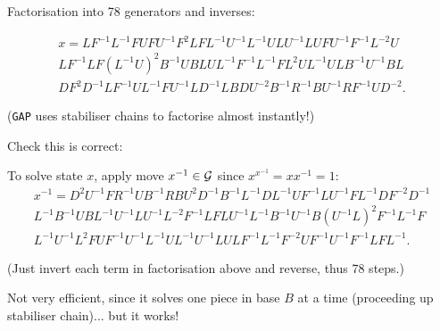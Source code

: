 \begin{slide}
    Factorisation into 78 generators and inverses: \pause
    {\scriptsize }
    \vspace{-0.5cm}

    {\footnotesize \begin{multline*}
            x = LF^{-1}L^{-1}FUFU^{-1}F^2LFL^{-1}U^{-1}L^{-1}ULU^{-1}LUFU^{-1}F^{-1}L^{-2}U \\
            LF^{-1}LF(L^{-1}U)^2B^{-1}UBLUL^{-1}F^{-1}L^{-1}FL^2UL^{-1}ULB^{-1}U^{-1}BL \\
            DF^2D^{-1}LF^{-1}UL^{-1}FU^{-1}LD^{-1}LBDU^{-2}B^{-1}R^{-1}BU^{-1}RF^{-1}UD^{-2}.
        \end{multline*}} \pause

    \vspace{-0.5cm}
    (\texttt{GAP} uses stabiliser chains to factorise almost instantly!)
\end{slide}

\begin{slide}
    Check this is correct:
    {\scriptsize } \pause

    To solve state $x$, apply move $x^{-1} \in \mathcal{G}$ since \pause $x^{x^{-1}} = xx^{-1} = 1$:
    {\scriptsize \begin{multline*}
        x^{-1} = D^2U^{-1}FR^{-1}UB^{-1}RBU^2D^{-1}B^{-1}L^{-1}DL^{-1}UF^{-1}LU^{-1}FL^{-1}DF^{-2}D^{-1} \\
        L^{-1}B^{-1}UBL^{-1}U^{-1}LU^{-1}L^{-2}F^{-1}LFLU^{-1}L^{-1}B^{-1}U^{-1}B(U^{-1}L)^2F^{-1}L^{-1}F \\
        L^{-1}U^{-1}L^2FUF^{-1}U^{-1}L^{-1}UL^{-1}U^{-1}LULF^{-1}L^{-1}F^{-2}UF^{-1}U^{-1}F^{-1}LFL^{-1}.
    \end{multline*}}

    (Just invert each term in factorisation above and reverse, thus 78 steps.) \pause

    Not very efficient, since it solves one piece in base $B$ at a time (proceeding up stabiliser chain)... but it works!
\end{slide}